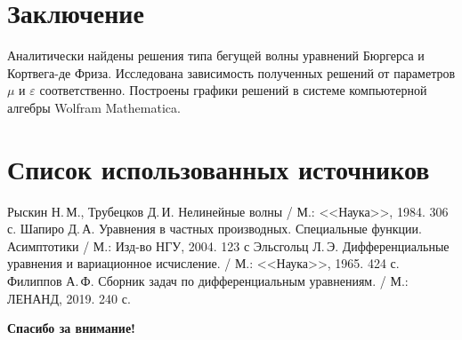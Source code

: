 \documentclass[unicode]{beamer}
\begin{document}
\section{Заключение}
\newpage
Аналитически найдены решения типа бегущей волны уравнений Бюргерса и Кортвега-де Фриза. Исследована зависимость полученных решений от параметров $\mu$ и $\varepsilon$ соответственно. Построены графики решений в системе компьютерной алгебры Wolfram Mathematica.

\newpage
\section{Список использованных источников}
\begin{thebibliography}{12}
 Рыскин Н.\,М., Трубецков Д.\,И. Нелинейные волны / М.: <<Наука>>, 1984. 306 с.
 Шапиро Д.\,А. Уравнения в частных производных. Специальные функции. Асимптотики  / М.: Изд-во НГУ, 2004. 123 с
 Эльсгольц Л.\,Э.  Дифференциальные уравнения и вариационное исчисление. / М.: <<Наука>>, 1965. 424 с.
 Филиппов А.\,Ф. Сборник задач по дифференциальным уравнениям. / М.: ЛЕНАНД, 2019. 240 с.
\end{thebibliography}
\newpage







\vspace{1mm}\vspace{1mm}\vspace{1mm}\vspace{1mm}\vspace{1mm}\vspace{1mm}\vspace{1mm}\vspace{1mm}\vspace{1mm}\vspace{1mm}\vspace{1mm}\vspace{1mm}\vspace{1mm}\vspace{1mm}\vspace{1mm}\vspace{1mm}\vspace{1mm}\vspace{1mm}\vspace{1mm}\vspace{1mm}\vspace{1mm}\centering \bf{Спасибо за внимание!}
\end{document}
